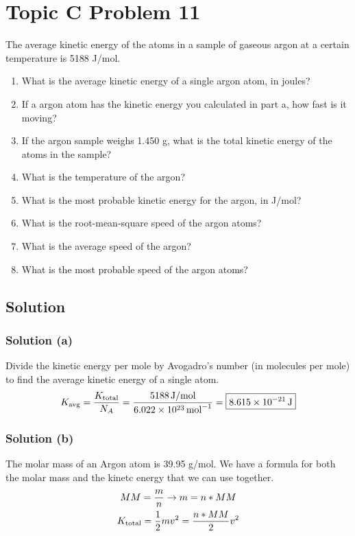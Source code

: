 \documentclass[10pt]{article}
\newcommand{\E}[1]{\times 10^{#1}}
\begin{document}
    \pagebreak
    \section{Topic C Problem 11}
        The average kinetic energy of the atoms in a sample of gaseous argon at a certain temperature is 5188 J/mol.
        \begin{enumerate} [label=\alph*)]
            \item What is the average kinetic energy of a single argon atom, in joules?
            \item If a argon atom has the kinetic energy you calculated in part a, how fast is it moving?
            \item If the argon sample weighs 1.450 g, what is the total kinetic energy of the atoms in the sample?
            \item What is the temperature of the argon?
            \item What is the most probable kinetic energy for the argon, in J/mol?
            \item What is the root-mean-square speed of the argon atoms?
            \item What is the average speed of the argon?
            \item What is the most probable speed of the argon atoms?
        \end{enumerate}

        \subsection{Solution}
            \subsubsection{Solution (a)}
                Divide the kinetic energy per mole by Avogadro's number (in molecules per mole) to find the average kinetic energy of a single atom.
                \begin{gather}
                    K_{\rm avg} =   \frac{K_{\rm total}}{N_A}
                        =   \frac{5188\,\unit{\joule/\mole}}{6.022\E{23}\,\unit{\mole^{-1}}}
                        =   \boxed{8.615\E{-21}\,\unit{\joule}}
                \end{gather}

            \subsubsection{Solution (b)}
                The molar mass of an Argon atom is 39.95 \unit{\gram/\mole}.
                We have a formula for both the molar mass and the kinetc energy that we can use together.
                \begin{gather}
                    MM  =   \frac{m}{n} \to
                    m   =   n * MM\\
                    K_{\rm total}   =   \frac{1}{2}mv^2
                        =   \frac{n * MM}{2}v^2
                \end{gather}
\end{document}
